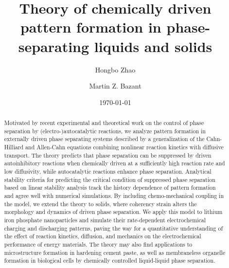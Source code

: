 \documentclass[reprint,aps,pre,superscriptaddress]{revtex4-2}
\begin{document}
\title{ Theory of chemically driven pattern formation in phase-separating liquids and solids }

\author{Hongbo Zhao}
\author{Martin Z. Bazant}
\date{\today}

\begin{abstract}
  Motivated by recent experimental and theoretical work on the control of phase separation by (electro-)autocatalytic reactions, we analyze pattern formation in externally driven phase separating systems described by a generalization of the Cahn-Hilliard and Allen-Cahn equations combining nonlinear reaction kinetics with diffusive transport. The theory predicts that phase separation can be suppressed by driven autoinhibitory reactions when chemically driven at a sufficiently high reaction rate and low diffusivity, while autocatalytic reactions enhance phase separation. Analytical stability criteria for predicting the critical condition of suppressed phase separation based on linear stability analysis track the history dependence of pattern formation and agree well with numerical simulations. By including chemo-mechanical coupling in the model, we extend the theory to solids, where coherency strain alters the morphology and dynamics of driven phase separation. We apply this model to lithium iron phosphate nanoparticles and simulate their rate-dependent electrochemical charging and discharging patterns, paving the way for a quantitative understanding of the effect of reaction kinetics, diffusion, and mechanics on the electrochemical performance of energy materials. The theory may also find applications to microstructure formation in hardening cement paste, as well as membraneless organelle formation in biological cells by chemically controlled liquid-liquid phase separation.
\end{abstract}
\end{document}

